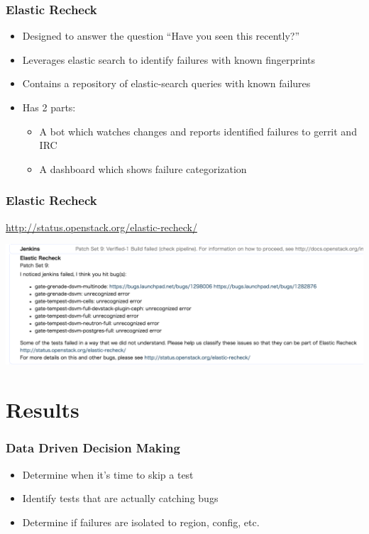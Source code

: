\documentclass[aspectratio=169,11pt,hyperref={colorlinks=true}]{beamer}
\begin{document}
\begin{frame}
  \frametitle{Elastic Recheck}
  \begin{itemize}
    \item Designed to answer the question ``Have you seen this recently?''
    \item Leverages elastic search to identify failures with known fingerprints
    \item Contains a repository of elastic-search queries with known failures
    \item Has 2 parts:
        \begin{itemize}
            \item A bot which watches changes and reports identified failures to gerrit and IRC
            \item A dashboard which shows failure categorization
        \end{itemize}
    \end{itemize}
\end{frame}

\begin{frame}
    \frametitle{Elastic Recheck}
    \href{http://status.openstack.org/elastic-recheck/}{http://status.openstack.org/elastic-recheck/}
  \begin{center}
    \includegraphics[width=.73\textwidth]{elastic-recheck-sample.png}
  \end{center}
\end{frame}


\section{Results}
\begin{frame}
    \frametitle{Data Driven Decision Making}
    \begin{itemize}
        \item Determine when it's time to skip a test
        \item Identify tests that are actually catching bugs
        \item Determine if failures are isolated to region, config, etc.
    \end{itemize}
\end{frame}
\end{document}
